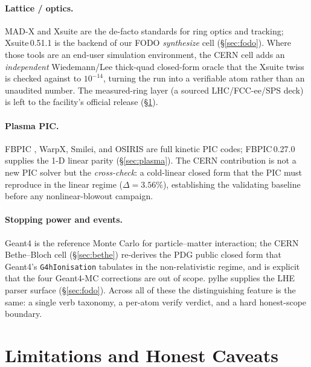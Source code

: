 \documentclass[11pt,a4paper]{article}
\begin{document}
\paragraph{Lattice / optics.} MAD-X and Xsuite \citep{wiedemann2015} are
the de-facto standards for ring optics and tracking; Xsuite\,0.51.1 is
the backend of our FODO \emph{synthesize} cell (\S\ref{sec:fodo}). Where
those tools are an end-user simulation environment, the CERN cell adds an
\emph{independent} Wiedemann/Lee thick-quad closed-form oracle that the
Xsuite twiss is checked against to $10^{-14}$, turning the run into a
verifiable atom rather than an unaudited number. The measured-ring layer
(a sourced LHC/FCC-ee/SPS deck) is left to the facility's official
release (\S\ref{sec:limits}).

\paragraph{Plasma PIC.} FBPIC \citep{lehe2016fbpic}, WarpX, Smilei, and
OSIRIS are full kinetic PIC codes; FBPIC\,0.27.0 supplies the 1-D linear
parity (\S\ref{sec:plasma}). The CERN contribution is not a new PIC
solver but the \emph{cross-check}: a cold-linear closed form
\citep{dawson1959,esarey2009lpa} that the PIC must reproduce in the
linear regime ($\Delta=3.56\%$), establishing the validating baseline
before any nonlinear-blowout campaign.

\paragraph{Stopping power and events.} Geant4 \citep{agostinelli2003geant4}
is the reference Monte Carlo for particle--matter interaction; the CERN
Bethe--Bloch cell (\S\ref{sec:bethe}) re-derives the PDG public closed
form \citep{pdg2024} that Geant4's \texttt{G4hIonisation} tabulates in
the non-relativistic regime, and is explicit that the four Geant4-MC
corrections are out of scope. pylhe supplies the LHE parser surface
(\S\ref{sec:fodo}). Across all of these the distinguishing feature is the
same: a single verb taxonomy, a per-atom verify verdict, and a hard
honest-scope boundary.

\section{Limitations and Honest Caveats}
\label{sec:limits}
\end{document}
